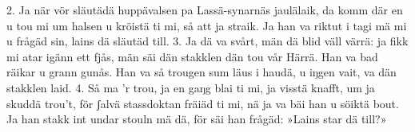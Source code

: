 \begin{adjustwidth}{7mm}{7mm}
2.  Ja när vör släutädä huppävalsen
    pa Lassä-synarnäs jaulälaik,
    da komm där en u tou mi um halsen
    u kröistä ti mi, så att ja straik.
    Ja han va riktut i tagi mä mi
    u frågäd sin, lains dä släutäd till.
3.  Ja dä va svårt, män dä blid väll värrä:
    ja fikk mi atar igänn ett fjås,
    män säi dän stakklen dän tou vår Härrä.
    Han va bad räikar u grann gunås.
    Han va så trougen sum läus i haudä,
    u iŋgen vait, va dän stakklen laid.
4.  Så ma ’r trou, ja en gaŋg blai ti mi,
    ja visstä knafft, um ja skuddä trou’t,
    för ʃalvä stassdoktan fräiäd ti mi,
    nä ja va bäi han u söiktä bout.
    Ja han stakk int undar stouln mä dä,
    för säi han frågäd: »Lains star dä till?»
\end{adjustwidth}